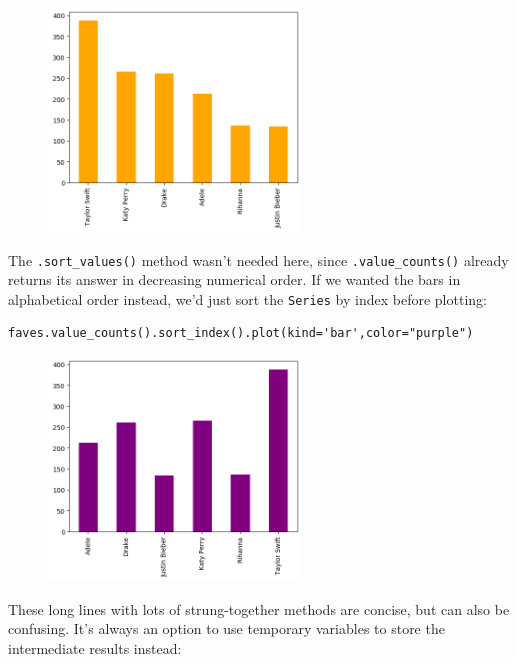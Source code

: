\begin{figure}[ht]
\centering
\includegraphics[width=0.6\textwidth]{celebs.png}
\end{figure}


The \texttt{.sort\_values()} method wasn't needed here, since
\texttt{.value\_counts()} already returns its answer in decreasing numerical
order. If we wanted the bars in alphabetical order instead, we'd just sort the
\texttt{Series} by index before plotting:

\begin{Verbatim}[fontsize=\small,samepage=true,frame=single,framesep=3mm]
faves.value_counts().sort_index().plot(kind='bar',color="purple")
\end{Verbatim}

\begin{figure}[ht]
\centering
\includegraphics[width=0.6\textwidth]{celebs2.png}
\end{figure}

These long lines with lots of strung-together methods are concise, but can also
be confusing. It's always an option to use temporary variables to store the
intermediate results instead:

